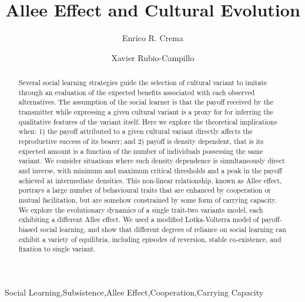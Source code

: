 \documentclass[review,authoryear]{elsarticle}
\begin{document}
\begin{frontmatter}

\title{Allee Effect and Cultural Evolution}


\author[label1,label2]{Enrico R. Crema}
\author[label3]{Xavier Rubio-Campillo}

\address[label1]{CaSEs - Complexity and Socio-Ecological Dynamics Research Group, Barcelona}
\address[label2]{UCL Institute of Archaeology}
\address[label3]{BSC - Barcelona Supercomputing Center}



\begin{abstract}
Several social learning strategies guide the selection of cultural variant to imitate through an evaluation of the expected benefits associated with each observed alternatives. The assumption of the social learner is that the payoff received by the transmitter while expressing a given cultural variant is a proxy for for inferring the qualitative features of the variant itself. Here we explore the theoretical implications when: 1) the payoff attributed to a given cultural variant directly affects the reproductive success of its bearer;  and 2) payoff is density dependent, that is its expected amount is a function of the number of individuals possessing the same variant. We consider situations where such density dependence is simultaneously direct and inverse, with minimum and maximum critical thresholds and a peak in the payoff achieved at intermediate densities. This non-linear relationship, known as Allee effect, portrays a large number of behavioural traits that are enhanced by cooperation or mutual facilitation, but are somehow constrained by some form of carrying capacity.  We explore the evolutionary dynamics of a single trait-two variants model, each exhibiting a different Allee effect. We used a modified Lotka-Volterra model of payoff-biased social learning, and show that different degrees of reliance on social learning can exhibit a variety of equilibria, including episodes of reversion, stable co-existence, and fixation to single variant.

\end{abstract}

\begin{keyword}
Social Learning\sep Subsistence\sep Allee Effect\sep Cooperation\sep Carrying Capacity
\end{keyword}

\end{frontmatter}
\end{document}
